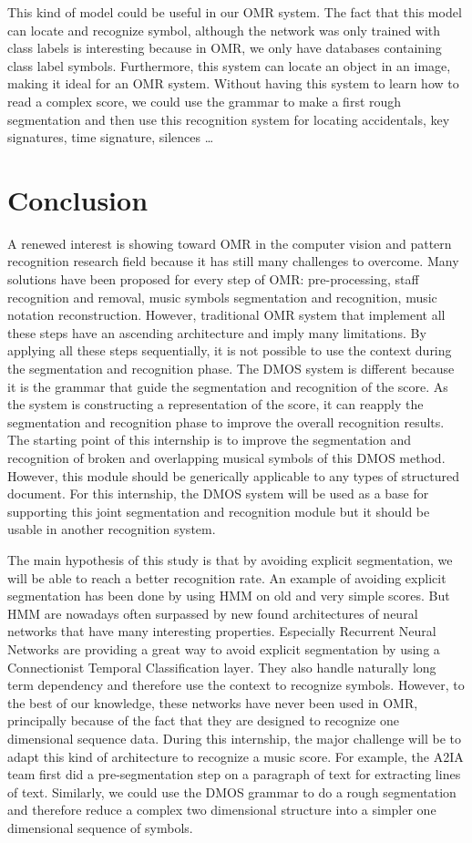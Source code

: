 \documentclass[11pt]{sdm}
\begin{document}
This kind of model could be useful in our OMR system.
The fact that this model can locate and recognize symbol, although the network was only trained with class labels is interesting because in OMR, we only have databases containing class label symbols.
Furthermore, this system can locate an object in an image, making it ideal for an OMR system.
Without having this system to learn how to read a complex score, we could use the grammar to make a first rough segmentation and then use this recognition system for locating accidentals, key signatures, time signature, silences \ldots

\section{Conclusion}

A renewed interest is showing toward OMR in the computer vision and pattern recognition research field because it has still many challenges to overcome.
Many solutions have been proposed for every step of OMR: pre-processing, staff recognition and removal, music symbols segmentation and recognition, music notation reconstruction.
However, traditional OMR system that implement all these steps have an ascending architecture and imply many limitations.
By applying all these steps sequentially, it is not possible to use the context during the segmentation and recognition phase.
The DMOS system is different because it is the grammar that guide the segmentation and recognition of the score.
As the system is constructing a representation of the score, it can reapply the segmentation and recognition phase to improve the overall recognition results.
The starting point of this internship is to improve the segmentation and recognition of broken and overlapping musical symbols of this DMOS method.
However, this module should be generically applicable to any types of structured document.
For this internship, the DMOS system will be used as a base for supporting this joint segmentation and recognition module but it should be usable in another recognition system.

The main hypothesis of this study is that by avoiding explicit segmentation, we will be able to reach a better recognition rate.
An example of avoiding explicit segmentation has been done by using HMM on old and very simple scores.
But HMM are nowadays often surpassed by new found architectures of neural networks that have many interesting properties.
Especially Recurrent Neural Networks are providing a great way to avoid explicit segmentation by using a Connectionist Temporal Classification layer.
They also handle naturally long term dependency and therefore use the context to recognize symbols.
However, to the best of our knowledge, these networks have never been used in OMR, principally because of the fact that they are designed to recognize one dimensional sequence data.
During this internship, the major challenge will be to adapt this kind of architecture to recognize a music score.
For example, the A2IA team first did a pre-segmentation step on a paragraph of text for extracting lines of text.
Similarly, we could use the DMOS grammar to do a rough segmentation and therefore reduce a complex two dimensional structure into a simpler one dimensional sequence of symbols.
\end{document}
